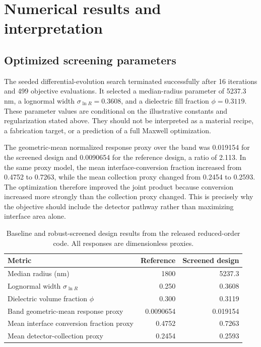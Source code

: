 \documentclass[10.5pt,a4paper]{article}
\begin{document}
\section{Numerical results and interpretation}
\subsection{Optimized screening parameters}
The seeded differential-evolution search terminated successfully after 16 iterations and 499 objective evaluations. It selected a median-radius parameter of 5237.3 nm, a lognormal width $\sigma_{\ln R}=0.3608$, and a dielectric fill fraction $\phi=0.3119$. These parameter values are conditional on the illustrative constants and regularization stated above. They should not be interpreted as a material recipe, a fabrication target, or a prediction of a full Maxwell optimization.

The geometric-mean normalized response proxy over the band was 0.019154 for the screened design and 0.0090654 for the reference design, a ratio of 2.113. In the same proxy model, the mean interface-conversion fraction increased from 0.4752 to 0.7263, while the mean collection proxy changed from 0.2454 to 0.2593. The optimization therefore improved the joint product because conversion increased more strongly than the collection proxy changed. This is precisely why the objective should include the detector pathway rather than maximizing interface area alone.

\begin{table}[H]\centering\small
\caption{Baseline and robust-screened design results from the released reduced-order code. All responses are dimensionless proxies.}
\begin{tabularx}{\textwidth}{p{}rr}
\toprule
Metric & Reference & Screened design\\
\midrule
Median radius (nm) & 1800 & 5237.3\\
Lognormal width $\sigma_{\ln R}$ & 0.250 & 0.3608\\
Dielectric volume fraction $\phi$ & 0.300 & 0.3119\\
Band geometric-mean response proxy & 0.0090654 & 0.019154\\
Mean interface conversion fraction proxy & 0.4752 & 0.7263\\
Mean detector-collection proxy & 0.2454 & 0.2593\\
\bottomrule
\end{tabularx}
\end{table}
\end{document}
